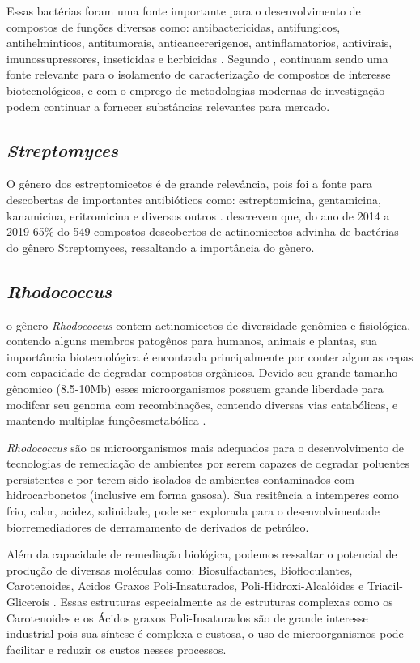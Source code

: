 Essas bactérias foram uma fonte importante para o desenvolvimento de compostos de funções
diversas como: antibactericidas, antifungicos, antihelminticos, antitumorais, anticancererigenos,
antinflamatorios, antivirais, imunossupressores, inseticidas e herbicidas \cite{demain2009,jose2021}.
Segundo , continuam sendo uma fonte relevante
para o isolamento de caracterização de compostos de interesse biotecnológicos, e com o
emprego de metodologias modernas de investigação podem continuar a fornecer
substâncias relevantes para mercado.

\subsection{\textit{Streptomyces}}
O gênero dos estreptomicetos é de grande relevância, pois foi a fonte para descobertas de importantes antibióticos 
como: estreptomicina, gentamicina, kanamicina, eritromicina e diversos outros \cite{demain2009}.
 descrevem que, do ano de 2014 a 2019 65\% do 549 compostos descobertos
de actinomicetos advinha de bactérias do gênero Streptomyces, ressaltando a importância do gênero.



\subsection{\textit{Rhodococcus}}
o gênero \textit{Rhodococcus} contem actinomicetos de diversidade genômica e fisiológica,
contendo alguns membros patogênos para humanos, animais e plantas, sua importância biotecnológica
é encontrada principalmente por conter algumas cepas com capacidade de degradar compostos orgânicos.
Devido seu grande tamanho gênomico (8.5-10Mb) esses microorganismos possuem grande liberdade
para modifcar seu genoma com recombinações, contendo diversas vias catabólicas, e mantendo 
multiplas funçõesmetabólica \cite{cappelletti2019}.

\textit{Rhodococcus} são os microorganismos mais adequados para o desenvolvimento de
tecnologias de remediação de ambientes por serem capazes de degradar poluentes persistentes e por
terem sido isolados de ambientes contaminados com hidrocarbonetos 
(inclusive em forma gasosa)\cite{kuyukina2019}. Sua resitência a intemperes como frio, calor, acidez,
salinidade, pode ser explorada para o desenvolvimentode biorremediadores de derramamento de derivados
de petróleo.

Além da capacidade de remediação biológica, podemos ressaltar o potencial de produção de diversas moléculas
como: Biosulfactantes, Biofloculantes, Carotenoides, Acidos Graxos Poli-Insaturados, Poli-Hidroxi-Alcalóides e
Triacil-Glicerois \cite{cappelletti2020}. Essas estruturas especialmente as de estruturas complexas como os
Carotenoides e os Ácidos graxos Poli-Insaturados são de grande interesse industrial pois sua síntese 
é complexa e custosa, o uso de microorganismos pode facilitar e reduzir os custos nesses processos.

